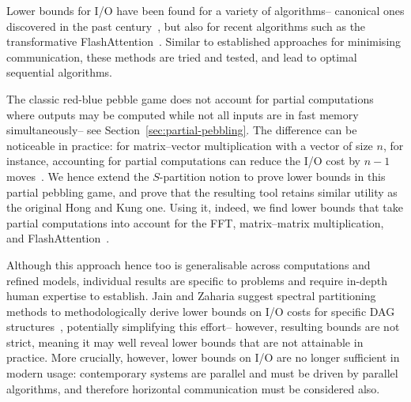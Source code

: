 \documentclass[oneside,reqno, a4paper]{amsart}
\numberwithin{equation}{section}
\begin{document}
Lower bounds for I/O have been found for a variety of algorithms--
canonical ones discovered in the past century~\cite{HongKung,aggarwal88,toledo99,irony04},
but also for recent algorithms such as the transformative FlashAttention~\cite{Saha}.
Similar to established approaches for minimising communication,
these methods are tried and tested,
and lead to optimal sequential algorithms.

The classic red-blue pebble game does not account for partial computations %
where outputs may be computed while not all inputs are in fast memory simultaneously--
see Section~\ref{sec:partial-pebbling}.
The difference can be noticeable in practice:
for matrix--vector multiplication with a vector of size $n$, for instance,
accounting for partial computations can reduce the I/O cost by $n-1$ moves~\cite{partial_opdas}.
We hence extend the $S$-partition notion to prove lower bounds in this partial pebbling game,
and prove that the resulting tool retains similar utility as the original Hong and Kung one. %
Using it,
indeed,
we find lower bounds that take partial computations into account %
for the FFT, matrix--matrix multiplication, and FlashAttention~\cite{partial_opdas}.

Although this approach hence too is generalisable across computations and refined models,
individual results are specific to problems and require in-depth human expertise to establish.
Jain and Zaharia suggest spectral partitioning methods to methodologically derive lower bounds on I/O costs for specific DAG structures~\cite{jain20},
potentially simplifying this effort--
however, resulting bounds are not strict,
meaning it may well reveal lower bounds that are not attainable in practice. %
More crucially, however, lower bounds on I/O are no longer sufficient in modern usage:
contemporary systems are parallel and must be driven by parallel algorithms,
and therefore horizontal communication must be considered also.
\end{document}
